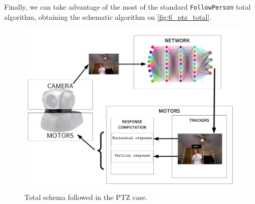 	Finally, we can take advantage of the most of the standard \texttt{FollowPerson} total algorithm, obtaining the schematic algorithm on \autoref{fig:6_ptz_total}.
	
	
	\begin{figure}[h]
		\centering
		\includegraphics[width=5.5in]{images/ptz_general_schema}
		\caption{Total schema followed in the PTZ case.}
		\label{fig:6_ptz_total}
	\end{figure}